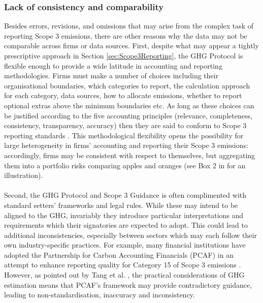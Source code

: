 \documentclass[12pt,twoside]{report}
\begin{document}
\subsubsection{Lack of consistency and comparability}
Besides errors, revisions, and omissions that may arise from the complex task of reporting Scope 3 emissions, there are other reasons why the data may not be comparable across firms or data sources. First, despite what may appear a tightly prescriptive approach in Section \ref{sec:Scope3Reporting}, the GHG Protocol is flexible enough to provide a wide latitude in accounting and reporting methodologies. Firms must make a number of choices including their organisational boundaries, which categories to report, the calculation approach for each category, data sources, how to allocate emissions, whether to report optional extras above the minimum boundaries etc. As long as these choices can be justified according to the five accounting principles (relevance, completeness, consistency, transparency, accuracy) then they are said to conform to Scope 3 reporting standards \cite{ghgscope32013}. This methodological flexibility opens the possibility for large heterogeneity in firms' accounting and reporting their Scope 3 emissions: accordingly, firms may be consistent with respect to themselves, but aggregating them into a portfolio risks comparing apples and oranges (see Box 2 in \cite{ftserussell2024} for an illustration). 
\\ \\
Second, the GHG Protocol and Scope 3 Guidance is often complimented with standard setters' frameworks and legal rules. While these may intend to be aligned to the GHG, invariably they introduce particular interpretations and requirements which their signatories are expected to adopt. This could lead to additional inconsistencies, especially between sectors which may each follow their own industry-specific practices. For example, many financial institutions have adopted the Partnership for Carbon Accounting Financials (PCAF) in an attempt to enhance reporting quality for Category 15 of Scope 3 emissions \cite{PCAF2022}. However, as pointed out by Tang et al. \cite{Tang2023}, the practical considerations of GHG estimation means that PCAF's framework may provide contradictory guidance, leading to non-standardisation, inaccuracy and inconsistency. 
\\ \\
\end{document}
